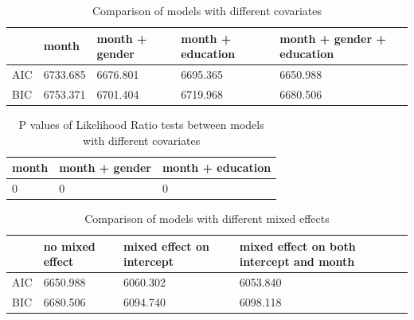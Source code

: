 \begin{table}[H]
\centering
\begin{tabular}{|l|l|l|l|l|}
\hline
& month & month + gender & month + education & month + gender + education \\
\hline
AIC & 6733.685 & 6676.801 & 6695.365 & 6650.988 \\
\hline
BIC & 6753.371 & 6701.404 & 6719.968 & 6680.506 \\
\hline
\end{tabular}
\caption{Comparison of models with different covariates}
\label{tab:model.comp}
\end{table}

\begin{table}[H]
\centering
\begin{tabular}{|l|l|l|}
\hline
month & month + gender & month + education \\
\hline
0 & 0 & 0 \\
\hline
\end{tabular}
\caption{P values of Likelihood Ratio tests between models with different covariates}
\label{tab:model.comp.lrt}
\end{table}

\begin{table}[H]
\centering
\begin{tabular}{|l|l|l|l|}
\hline
& no mixed effect & mixed effect on intercept & mixed effect on both intercept and month \\
\hline
AIC & 6650.988 & 6060.302 & 6053.840 \\
\hline
BIC & 6680.506 & 6094.740 & 6098.118 \\
\hline
\end{tabular}
\caption{Comparison of models with different mixed effects}
\label{tab:model.comp.me}
\end{table}

\begin{table}[H]
\centering
{}
\caption{P values of Likelihood Ratio tests between models with different mixed effects}
\label{tab:model.comp.me.lrt}
\end{table}

